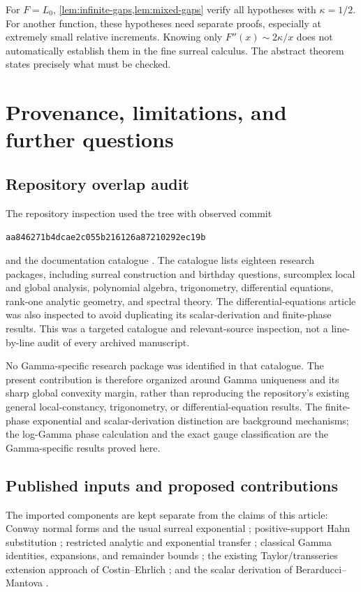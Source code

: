 \documentclass[11pt,letterpaper]{article}
\numberwithin{equation}{section}
\theoremstyle{plain}
\theoremstyle{definition}
\theoremstyle{remark}
\newcommand{\commit}{\nolinkurl{aa846271b4dcae2c055b216126a87210292ec19b}}
\begin{document}
For $F=L_0$, \cref{lem:infinite-gaps,lem:mixed-gaps} verify all hypotheses
with $\kappa=1/2$. For another function, these hypotheses need separate
proofs, especially at extremely small relative increments. Knowing only
$F''(x)\sim2\kappa/x$ does not automatically establish them in the fine
surreal calculus. The abstract theorem states precisely what must be checked.

\section{Provenance, limitations, and further questions}\label{sec:provenance}

\subsection{Repository overlap audit}
The repository inspection used the tree with observed commit
\begin{center}\small\commit\end{center}
and the documentation catalogue \cite{Repo}. The catalogue lists eighteen
research packages, including surreal construction and birthday questions,
surcomplex local and global analysis, polynomial algebra, trigonometry,
differential equations, rank-one analytic geometry, and spectral theory.
The differential-equations article was also inspected to avoid duplicating
its scalar-derivation and finite-phase results. This was a targeted catalogue
and relevant-source inspection, not a line-by-line audit of every archived
manuscript.

No Gamma-specific research package was identified in that catalogue.
The present contribution is therefore organized around Gamma uniqueness and
its sharp global convexity margin, rather than reproducing the repository's
existing general local-constancy, trigonometry, or differential-equation
results. The finite-phase exponential and scalar-derivation distinction are
background mechanisms; the log-Gamma phase calculation and the exact gauge
classification are the Gamma-specific results proved here.

\subsection{Published inputs and proposed contributions}
The imported components are kept separate from the claims of this article:
Conway normal forms and the usual surreal exponential
\cite{Conway,Gonshor}; positive-support Hahn substitution
\cite{Neumann}; restricted analytic and exponential transfer
\cite{vdDE}; classical Gamma identities, expansions, and remainder bounds
\cite{DLMF55,DLMF57,DLMF511,DLMF515}; the existing Taylor/transseries
extension approach of Costin--Ehrlich \cite{CE}; and the scalar derivation
of Berarducci--Mantova \cite{BM}.
\end{document}

